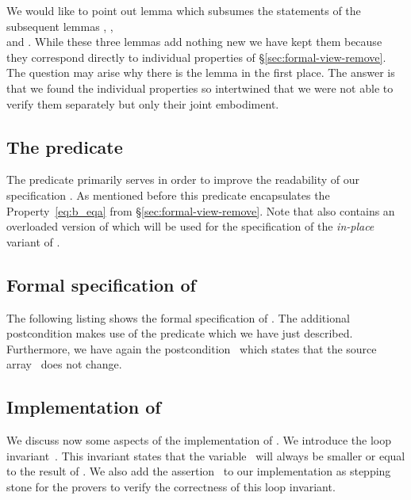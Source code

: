 \clearpage

We would like to point out lemma \RemovePartitionCore which subsumes
the statements of the subsequent lemmas \RemovePartitionUpper,
\RemovePartitionNotEqual,\\
and \RemovePartitionCount.
While these three lemmas add nothing new 
we have kept them because they correspond directly to individual properties
of \S\ref{sec:formal-view-remove}.
The question may arise why there is the lemma \RemovePartitionCore in the first place.
The answer is that we found the individual properties so intertwined
that we were not able to verify them separately but only their joint embodiment.


\subsection{The predicate \Remove}

The predicate  primarily serves 
in order to improve the readability of our specification .
As mentioned before this predicate encapsulates the Property~\eqref{eq:b_eqa}
from \S\ref{sec:formal-view-remove}.
Note that  also contains an overloaded version of
\Remove which will be used for the specification of the \emph{in-place}
variant  of \removecopy.



\clearpage

\subsection{Formal specification of \removecopyiii}

The following listing shows the formal specification of .
The additional postcondition  makes use of the predicate 
which we have just described.
Furthermore, we have again the postcondition~ which states that
the source array~ does not change.



\subsection{Implementation of \removecopyiii}
\label{sec:removecopyiii:impl}

We discuss now some aspects of the implementation of .
We introduce the loop invariant~.
This invariant states that the variable~ will
always be smaller or equal to the result of .
We also add the assertion~ to our implementation as stepping stone
for the provers to verify the correctness of this loop invariant.

